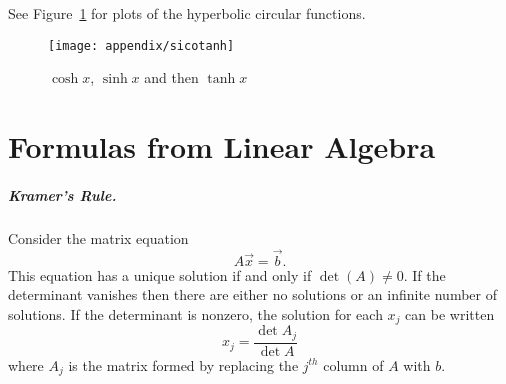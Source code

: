 See Figure~\ref{sicotanh} for plots of the hyperbolic
circular functions.

\begin{figure}[h!]
  \begin{center}
    \texttt{[image: appendix/sicotanh]}
  \end{center}
  \caption{$\cosh x$, $\sinh x$ and then $\tanh x$}
  \label{sicotanh}
\end{figure}





\raggedbottom
\chapter{Formulas from Linear Algebra}
\label{appendix formulas from linear algebra}
\flushbottom

\paragraph{Kramer's Rule.}

Consider the matrix equation
\[ A \vec{x} = \vec{b}. \]
This equation has a unique solution if and only if $\det(A) \neq 0$.  
If the determinant vanishes then there are either no solutions or an 
infinite number of solutions.
If the determinant is nonzero, the solution for each $x_j$ can be written
\[ x_j = \frac{\det A_j}{\det A} \]
where $A_j$ is the matrix formed by replacing the $j^{t h}$ column of $A$ 
with $b$.


